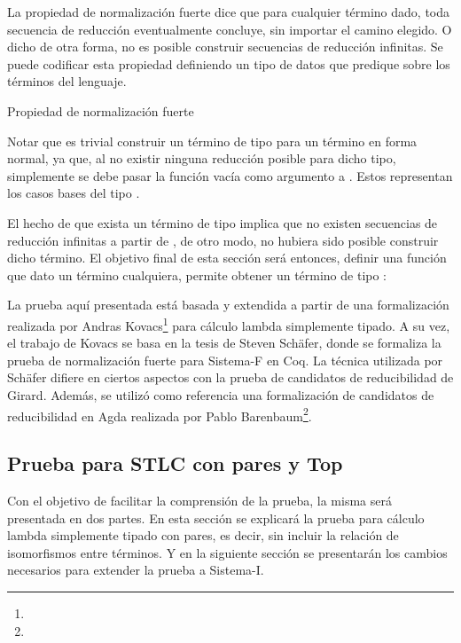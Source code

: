La propiedad de normalización fuerte dice que para cualquier término dado, toda secuencia de reducción eventualmente concluye, sin importar el camino elegido.
O dicho de otra forma, no es posible construir secuencias de reducción infinitas.
Se puede codificar esta propiedad definiendo un tipo de datos que predique sobre los términos del lenguaje.

\begin{codigo}
	Propiedad de normalización fuerte
\end{codigo}

Notar que es trivial construir un término de tipo  para un término en forma normal, ya que, al no existir ninguna reducción posible para dicho tipo, simplemente se debe pasar la función vacía como argumento a .
Estos representan los casos bases del tipo .

El hecho de que exista un término de tipo   implica que no existen secuencias de reducción infinitas a partir de , de otro modo, no hubiera sido posible construir dicho término.
El objetivo final de esta sección será entonces, definir una función que dato un término cualquiera, permite obtener un término de tipo  :

\AgdaSymbol{:}
\AgdaSymbol{\{}
\AgdaSymbol{\}}
\AgdaSymbol{(}
\AgdaSymbol{:}
\AgdaSymbol{)}

La prueba aquí presentada está basada y extendida a partir de una formalización realizada por 
Andras Kovacs\footnote{} para cálculo lambda simplemente tipado.
A su vez, el trabajo de Kovacs se basa en la tesis de Steven Schäfer\cite{Schafer}, donde se formaliza la prueba de normalización fuerte para Sistema-F en Coq.
La técnica utilizada por Schäfer difiere en ciertos aspectos con la prueba de candidatos de reducibilidad de Girard\cite{Girard}.
Además, se utilizó como referencia una formalización de candidatos de reducibilidad en Agda realizada por Pablo Barenbaum\footnote{}.

\subsection{Prueba para STLC con pares y Top}

Con el objetivo de facilitar la comprensión de la prueba, la misma será presentada en dos partes.
En esta sección se explicará la prueba para cálculo lambda simplemente tipado con pares, es decir, sin incluir la relación de isomorfismos entre términos.
Y en la siguiente sección se presentarán los cambios necesarios para extender la prueba a Sistema-I.



